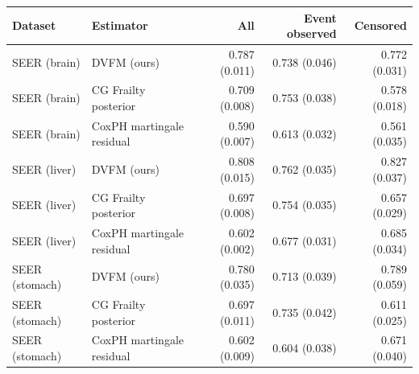 \begin{tabular}{llrrr}
\toprule
Dataset & Estimator & All & Event observed & Censored \\
\midrule
SEER (brain) & DVFM (ours) & 0.787 (0.011) & 0.738 (0.046) & 0.772 (0.031) \\
SEER (brain) & CG Frailty posterior & 0.709 (0.008) & 0.753 (0.038) & 0.578 (0.018) \\
SEER (brain) & CoxPH martingale residual & 0.590 (0.007) & 0.613 (0.032) & 0.561 (0.035) \\
SEER (liver) & DVFM (ours) & 0.808 (0.015) & 0.762 (0.035) & 0.827 (0.037) \\
SEER (liver) & CG Frailty posterior & 0.697 (0.008) & 0.754 (0.035) & 0.657 (0.029) \\
SEER (liver) & CoxPH martingale residual & 0.602 (0.002) & 0.677 (0.031) & 0.685 (0.034) \\
SEER (stomach) & DVFM (ours) & 0.780 (0.035) & 0.713 (0.039) & 0.789 (0.059) \\
SEER (stomach) & CG Frailty posterior & 0.697 (0.011) & 0.735 (0.042) & 0.611 (0.025) \\
SEER (stomach) & CoxPH martingale residual & 0.602 (0.009) & 0.604 (0.038) & 0.671 (0.040) \\
\bottomrule
\end{tabular}

